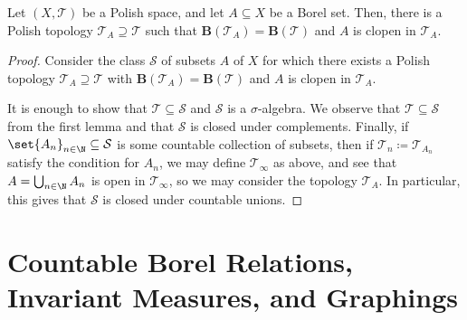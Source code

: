 \documentclass[10pt]{mypackage}
\renewcommand{\coloneq}{\coloneqq}
\begin{document}
\begin{theorem}
  Let $\left( X,\mathcal{T} \right)$ be a Polish space, and let $A\subseteq X$ be a Borel set. Then, there is a Polish topology $\mathcal{T}_A\supseteq \mathcal{T}$ such that $ \mathbf{B}\left( \mathcal{T}_A \right) = \mathbf{B}\left( \mathcal{T} \right) $ and $A$ is clopen in $\mathcal{T}_A$.
\end{theorem}
\begin{proof}
  Consider the class $\mathcal{S}$ of subsets $A$ of $X$ for which there exists a Polish topology $\mathcal{T}_A\supseteq \mathcal{T}$ with $ \mathbf{B}\left( \mathcal{T}_A \right) = \mathbf{B}\left( \mathcal{T} \right) $ and $A$ is clopen in $\mathcal{T}_A$.

  It is enough to show that $ \mathcal{T}\subseteq \mathcal{S} $ and $ \mathcal{S} $ is a $\sigma$-algebra. We observe that $ \mathcal{T}\subseteq \mathcal{S} $ from the first lemma and that $ \mathcal{S} $ is closed under complements. Finally, if $\set{A_n}_{n\in\N}\subseteq \mathcal{S}$ is some countable collection of subsets, then if $ \mathcal{T}_{n} \coloneq \mathcal{T}_{A_n} $ satisfy the condition for $A_n$, we may define $ \mathcal{T}_{\infty} $ as above, and see that $A = \bigcup_{n\in\N}A_n$ is open in $ \mathcal{T}_{\infty} $, so we may consider the topology $ \mathcal{T}_{A} $. In particular, this gives that $ \mathcal{S} $ is closed under countable unions.
\end{proof}
\section{Countable Borel Relations, Invariant Measures, and Graphings}%
\end{document}
